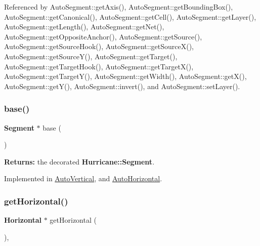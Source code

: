Referenced by Auto\+Segment\+::get\+Axis(), Auto\+Segment\+::get\+Bounding\+Box(), Auto\+Segment\+::get\+Canonical(), Auto\+Segment\+::get\+Cell(), Auto\+Segment\+::get\+Layer(), Auto\+Segment\+::get\+Length(), Auto\+Segment\+::get\+Net(), Auto\+Segment\+::get\+Opposite\+Anchor(), Auto\+Segment\+::get\+Source(), Auto\+Segment\+::get\+Source\+Hook(), Auto\+Segment\+::get\+Source\+X(), Auto\+Segment\+::get\+Source\+Y(), Auto\+Segment\+::get\+Target(), Auto\+Segment\+::get\+Target\+Hook(), Auto\+Segment\+::get\+Target\+X(), Auto\+Segment\+::get\+Target\+Y(), Auto\+Segment\+::get\+Width(), Auto\+Segment\+::get\+X(), Auto\+Segment\+::get\+Y(), Auto\+Segment\+::invert(), and Auto\+Segment\+::set\+Layer().

\mbox{\label{classKatabatic_1_1AutoSegment_ade416d0483aefe986988fa89a7cf6fcf}} 
\subsubsection{\texorpdfstring{base()}{base()}\hspace{0.1cm}{\footnotesize\ttfamily [2/2]}}
{\footnotesize\ttfamily \textbf{ Segment} $\ast$ base (\begin{DoxyParamCaption}{ }\end{DoxyParamCaption})\hspace{0.3cm}{\ttfamily [pure virtual]}}

{\bfseries Returns\+:} the decorated \textbf{ Hurricane\+::\+Segment}. 

Implemented in \mbox{\hyperlink{classKatabatic_1_1AutoVertical_a9e651c17b47f82166a02865c9296a2df}{Auto\+Vertical}}, and \mbox{\hyperlink{classKatabatic_1_1AutoHorizontal_a9e651c17b47f82166a02865c9296a2df}{Auto\+Horizontal}}.

\mbox{\label{classKatabatic_1_1AutoSegment_a659b8ed90de679564924afe07af478de}} 
\subsubsection{\texorpdfstring{get\+Horizontal()}{getHorizontal()}}
{\footnotesize\ttfamily \textbf{ Horizontal} $\ast$ get\+Horizontal (\begin{DoxyParamCaption}{ }\end{DoxyParamCaption})\hspace{0.3cm}{\ttfamily [inline]}, {\ttfamily [virtual]}}

